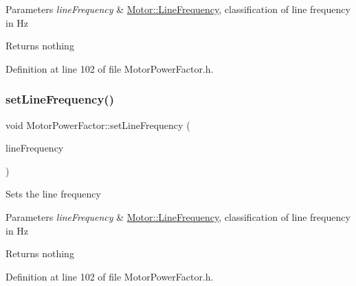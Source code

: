 \begin{DoxyParams}{Parameters}
{\em line\+Frequency} & \hyperlink{class_motor_acee1bdf1b684ad36cb80dc2829d9fcee}{Motor\+::\+Line\+Frequency}, classification of line frequency in Hz\\
\hline
\end{DoxyParams}
\begin{DoxyReturn}{Returns}
nothing 
\end{DoxyReturn}


Definition at line 102 of file Motor\+Power\+Factor.\+h.

\mbox{\label{class_motor_power_factor_a5186ccae4191cfc5b2b7c3bdbd166563}} 
\subsubsection{\texorpdfstring{set\+Line\+Frequency()}{setLineFrequency()}\hspace{0.1cm}{\footnotesize\ttfamily [3/3]}}
{\footnotesize\ttfamily void Motor\+Power\+Factor\+::set\+Line\+Frequency (\begin{DoxyParamCaption}\item[{\hyperlink{class_motor_acee1bdf1b684ad36cb80dc2829d9fcee}{Motor\+::\+Line\+Frequency}}]{line\+Frequency }\end{DoxyParamCaption})\hspace{0.3cm}{\ttfamily [inline]}}

Sets the line frequency


\begin{DoxyParams}{Parameters}
{\em line\+Frequency} & \hyperlink{class_motor_acee1bdf1b684ad36cb80dc2829d9fcee}{Motor\+::\+Line\+Frequency}, classification of line frequency in Hz\\
\hline
\end{DoxyParams}
\begin{DoxyReturn}{Returns}
nothing 
\end{DoxyReturn}


Definition at line 102 of file Motor\+Power\+Factor.\+h.

\mbox{\label{class_motor_power_factor_a4154bf52c6c9c9e5fb2f0985d7ae3531}} 
